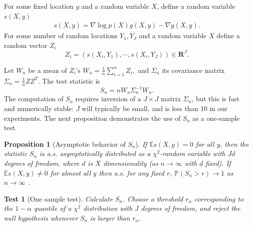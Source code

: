 \documentclass{article}
\newtheorem{test}{Test}
\newtheorem{proposition}{Proposition}
\newcommand{\ev}{\mathbb{E}}
\begin{document}
For some fixed location $y$ and a random variable $X$, define a random variable $s(X,y)$
\begin{align}
 s(X,y) = \nabla \log p(X) g(X,y) -  \nabla g(X,y).
\end{align}
For some number of random locations $Y_1,Y_J$ and a random variable $X$ define a random vector $Z_i$
\begin{equation}
 Z_i = ( s(X_i,Y_1) , \cdots, s(X_i,Y_J)  )\in \mathbf R^J.
\end{equation}

Let $W_n$ be a mean of $Z_i$'s
$W_n = \frac 1  n \sum_{i=1}^n Z_i, $
and $\Sigma_n$ its  covariance matrix
$\Sigma_n = \frac 1  n Z Z^{T}$.
The test statistic is
\begin{equation}
 S_n = n W_n \Sigma_n^{-1} W_n.
\end{equation}
The computation of $S_n$ requires inversion of a $J\times J$ matrix $\Sigma_n$, but this is fast and numerically stable: $J$ will typically be small, and is less than 10 in our experiments. The next proposition demonstrates the use of $S_n$ as a one-sample test.
\begin{proposition}[Asymptotic behavior of $S_n$]
\label{prop:Hotelling}
 If  $\ev s(X,y)=0$ for all $y$, then the statistic $S_n$ is a.s. asymptotically distributed as a $\chi^2$-random variable with $Jd$ degrees of freedom, where $d$ is $X$ dimensionality (as $n \to \infty$ with $d$ fixed). If  $\ev s(X,y) \neq 0$ for almost all $y$ then a.s. for any fixed $r$, $\mathbb P(S_n > r) \to 1$  as $n \to \infty$ .
\end{proposition}


\begin{test}[One sample test]
\label{test}
Calculate $S_n$. Choose a threshold $r_\alpha$ corresponding to the $1-\alpha$ quantile of a  $\chi^2$ distribution with $J$ degrees of freedom, and reject the null hypothesis whenever $S_n$ is larger than $r_\alpha$. 
\end{test}





\end{document}
